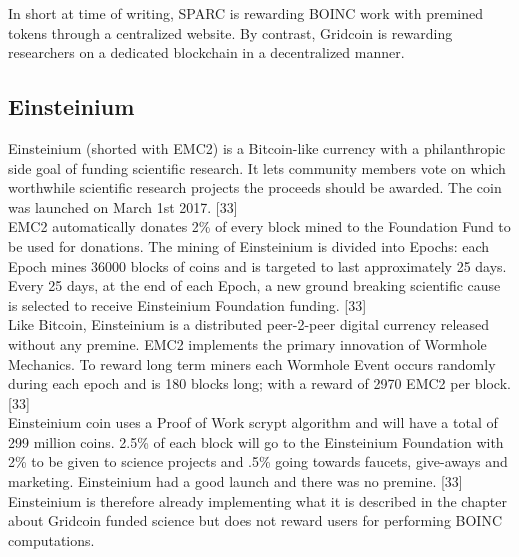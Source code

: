 In short at time of writing, SPARC is rewarding BOINC work with premined tokens through a centralized website. By contrast, Gridcoin is rewarding researchers on a dedicated blockchain in a decentralized manner.\\


\subsection{Einsteinium}

Einsteinium (shorted with EMC2) is a Bitcoin-like currency with a philanthropic side goal of funding scientific research. It lets community members vote on which worthwhile scientific research projects the proceeds should be awarded. The coin was launched on March 1st 2017. [33]\\


EMC2 automatically donates 2\% of every block mined to the Foundation Fund to be used for donations. The mining of Einsteinium is divided into Epochs: each Epoch mines 36000 blocks of coins and is targeted to last approximately 25 days. Every 25 days, at the end of each Epoch, a new ground breaking scientific cause is selected to receive Einsteinium Foundation funding. [33]\\

Like Bitcoin, Einsteinium is a distributed peer-2-peer digital currency released without any premine. EMC2 implements the primary innovation of Wormhole Mechanics. To reward long term miners each Wormhole Event occurs randomly during each epoch and is 180 blocks long; with a reward of 2970 EMC2 per block. [33]\\


Einsteinium coin uses a Proof of Work scrypt algorithm and will have a total of 299 million coins. 2.5\% of each block will go to the Einsteinium Foundation with 2\% to be given to science projects and .5\% going towards faucets, give-aways and marketing. Einsteinium had a good launch and there was no premine. [33]\\
 
Einsteinium is therefore already implementing what it is described in the chapter about Gridcoin funded science but does not reward users for performing BOINC computations.
